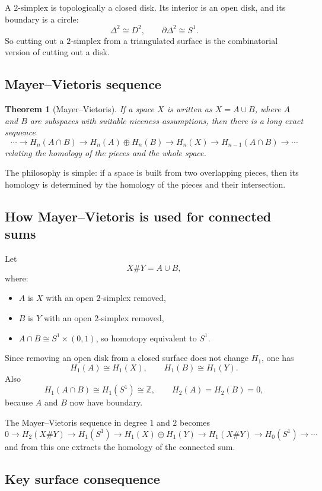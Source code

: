 \documentclass[12pt,a4paper]{article}
\newcommand{\Z}{\mathbb{Z}}
\newtheorem{theorem}{Theorem}
\theoremstyle{notespace}
\begin{document}
	A $2$-simplex is topologically a closed disk. Its interior is an open disk, and its boundary is a circle:
	\[
	\Delta^2\cong D^2,\qquad \partial \Delta^2\cong S^1.
	\]
	So cutting out a $2$-simplex from a triangulated surface is the combinatorial version of cutting out a disk.
	
	\subsection{Mayer--Vietoris sequence}
	
	\begin{theorem}[Mayer--Vietoris]
		If a space $X$ is written as $X=A\cup B$, where $A$ and $B$ are subspaces with suitable niceness assumptions, then there is a long exact sequence
		\[
		\cdots \to H_n(A\cap B)\to H_n(A)\oplus H_n(B)\to H_n(X)\to H_{n-1}(A\cap B)\to \cdots
		\]
		relating the homology of the pieces and the whole space.
	\end{theorem}
	
	The philosophy is simple: if a space is built from two overlapping pieces, then its homology is determined by the homology of the pieces and their intersection.
	
	\subsection{How Mayer--Vietoris is used for connected sums}
	
	Let
	\[
	X\#Y = A\cup B,
	\]
	where:
	\begin{itemize}[leftmargin=2em]
		\item $A$ is $X$ with an open $2$-simplex removed,
		\item $B$ is $Y$ with an open $2$-simplex removed,
		\item $A\cap B \cong S^1\times (0,1)$, so homotopy equivalent to $S^1$.
	\end{itemize}
	
	Since removing an open disk from a closed surface does not change $H_1$, one has
	\[
	H_1(A)\cong H_1(X),\qquad H_1(B)\cong H_1(Y).
	\]
	Also
	\[
	H_1(A\cap B)\cong H_1(S^1)\cong \Z,\qquad H_2(A)=H_2(B)=0,
	\]
	because $A$ and $B$ now have boundary.
	
	The Mayer--Vietoris sequence in degree $1$ and $2$ becomes
	\[
	0\to H_2(X\#Y)\to H_1(S^1)\to H_1(X)\oplus H_1(Y)\to H_1(X\#Y)\to H_0(S^1)\to \cdots
	\]
	and from this one extracts the homology of the connected sum.
	
	\subsection{Key surface consequence}
	
\end{document}
